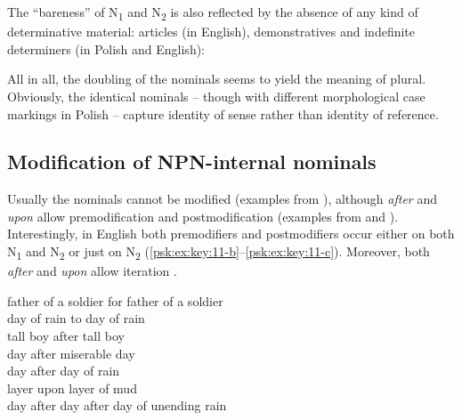 \documentclass[output=paper]{langscibook}
\begin{document}
The ``bareness'' of N\textsubscript{1} and N\textsubscript{2} is also reflected by the absence of any kind of determinative material: articles (in English), demonstratives and indefinite determiners (in Polish and English):

\ea\label{psk:ex:key:9}
\z
\z

\noindent All in all, the doubling of the nominals seems to yield the meaning of plural. Obviously, the identical nominals – though with different morphological case markings in Polish – capture identity of sense rather than identity of reference.

\subsection{Modification of NPN-internal nominals}\label{psk:sec:sec2-3}\largerpage

Usually the nominals cannot be modified  (examples from \citealt{Jackendoff2008}), although \textit{after} and \textit{upon} allow premodification and postmodification  (examples from \citealt{Jackendoff2008} and \citealt{Haik2013}). Interestingly, in English both premodifiers and postmodifiers occur either on both N\textsubscript{1} and N\textsubscript{2}  or just on N\textsubscript{2} (\ref{psk:ex:key:11-b}--\ref{psk:ex:key:11-c}). Moreover, both \textit{after} and \textit{upon} allow iteration .

\ea \label{psk:ex:key:10}  \ea * father of a soldier for father of a soldier\\
\ex   * day of rain to day of rain\\
\z\ex \label{psk:ex:key:11}  \ea\label{psk:ex:key:11-a} tall boy after tall boy\\
\ex\label{psk:ex:key:11-b} day after miserable day\\
\ex\label{psk:ex:key:11-c}   day after day of rain\\
\ex   layer upon layer of mud\\
\ex\label{psk:ex:key:11-e}   day after day after day of unending rain\\
\z\z
\end{document}
